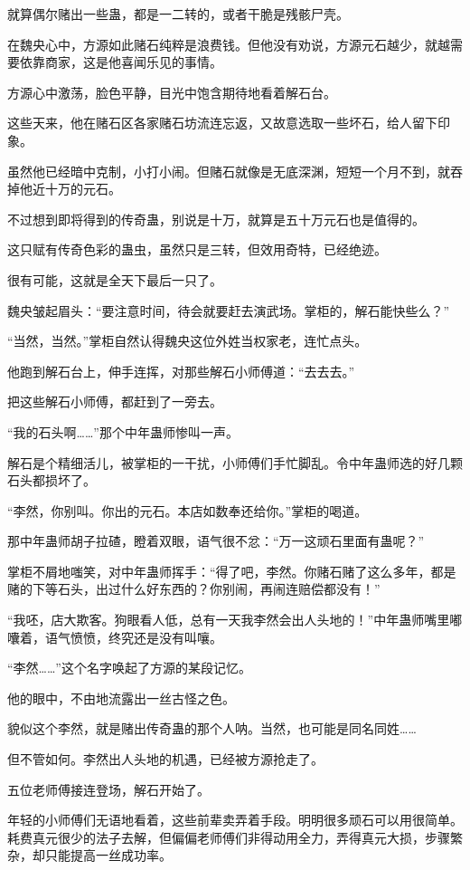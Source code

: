\begin{this_body}
就算偶尔赌出一些蛊，都是一二转的，或者干脆是残骸尸壳。

在魏央心中，方源如此赌石纯粹是浪费钱。但他没有劝说，方源元石越少，就越需要依靠商家，这是他喜闻乐见的事情。

方源心中激荡，脸色平静，目光中饱含期待地看着解石台。

这些天来，他在赌石区各家赌石坊流连忘返，又故意选取一些坏石，给人留下印象。

虽然他已经暗中克制，小打小闹。但赌石就像是无底深渊，短短一个月不到，就吞掉他近十万的元石。

不过想到即将得到的传奇蛊，别说是十万，就算是五十万元石也是值得的。

这只赋有传奇色彩的蛊虫，虽然只是三转，但效用奇特，已经绝迹。

很有可能，这就是全天下最后一只了。

魏央皱起眉头：“要注意时间，待会就要赶去演武场。掌柜的，解石能快些么？”

“当然，当然。”掌柜自然认得魏央这位外姓当权家老，连忙点头。

他跑到解石台上，伸手连挥，对那些解石小师傅道：“去去去。”

把这些解石小师傅，都赶到了一旁去。

“我的石头啊……”那个中年蛊师惨叫一声。

解石是个精细活儿，被掌柜的一干扰，小师傅们手忙脚乱。令中年蛊师选的好几颗石头都损坏了。

“李然，你别叫。你出的元石。本店如数奉还给你。”掌柜的喝道。

那中年蛊师胡子拉碴，瞪着双眼，语气很不忿：“万一这顽石里面有蛊呢？”

掌柜不屑地嗤笑，对中年蛊师挥手：“得了吧，李然。你赌石赌了这么多年，都是赌的下等石头，出过什么好东西的？你别闹，再闹连赔偿都没有！”

“我呸，店大欺客。狗眼看人低，总有一天我李然会出人头地的！”中年蛊师嘴里嘟囔着，语气愤愤，终究还是没有叫嚷。

“李然……”这个名字唤起了方源的某段记忆。

他的眼中，不由地流露出一丝古怪之色。

貌似这个李然，就是赌出传奇蛊的那个人呐。当然，也可能是同名同姓……

但不管如何。李然出人头地的机遇，已经被方源抢走了。

五位老师傅接连登场，解石开始了。

年轻的小师傅们无语地看着，这些前辈卖弄着手段。明明很多顽石可以用很简单。耗费真元很少的法子去解，但偏偏老师傅们非得动用全力，弄得真元大损，步骤繁杂，却只能提高一丝成功率。


\end{this_body}
